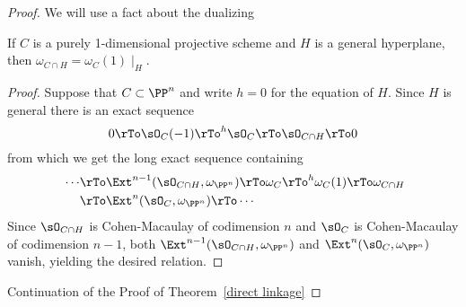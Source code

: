 \begin{proof}
We will use a fact about the dualizing
\begin{lemma}\label{restricting omega} If $C$ is a purely 1-dimensional projective scheme and $H$ is a general hyperplane,
then $\omega_{C\cap H} = \omega_C(1) \mid_H$.
\end{lemma}

\begin{proof}
Suppose  that $C\subset \PP^n$ and write $h=0$ for the equation of $H$. Since $H$ is general there is an exact sequence
$$
0\rTo \sO_C(-1) \rTo^h\sO_C\rTo \sO_{C\cap H} \rTo 0
$$
from which we get the long exact sequence containing
$$\
\begin{aligned}
 \cdots &\rTo \Ext^{n-1}(\sO_{C\cap H}, \omega_{\PP^n}) \rTo \omega_C \rTo^h\omega_C(1)\rTo \omega_{C\cap H}\\ 
 &\rTo 
\Ext^{n}(\sO_{C}, \omega_{\PP^n}) \rTo \cdots
\end{aligned}
$$
Since  $\sO_{C\cap H}$ is Cohen-Macaulay of codimension $n$ and $\sO_C$ is Cohen-Macaulay of codimension $n-1$,
both $\Ext^{n-1}(\sO_{C\cap H}, \omega_{\PP^n})$ and $\Ext^{n}(\sO_{C}, \omega_{\PP^n})$ vanish, yielding the desired relation.
\end{proof}

Continuation of the Proof of Theorem~\ref{direct linkage}

%


\end{proof}

